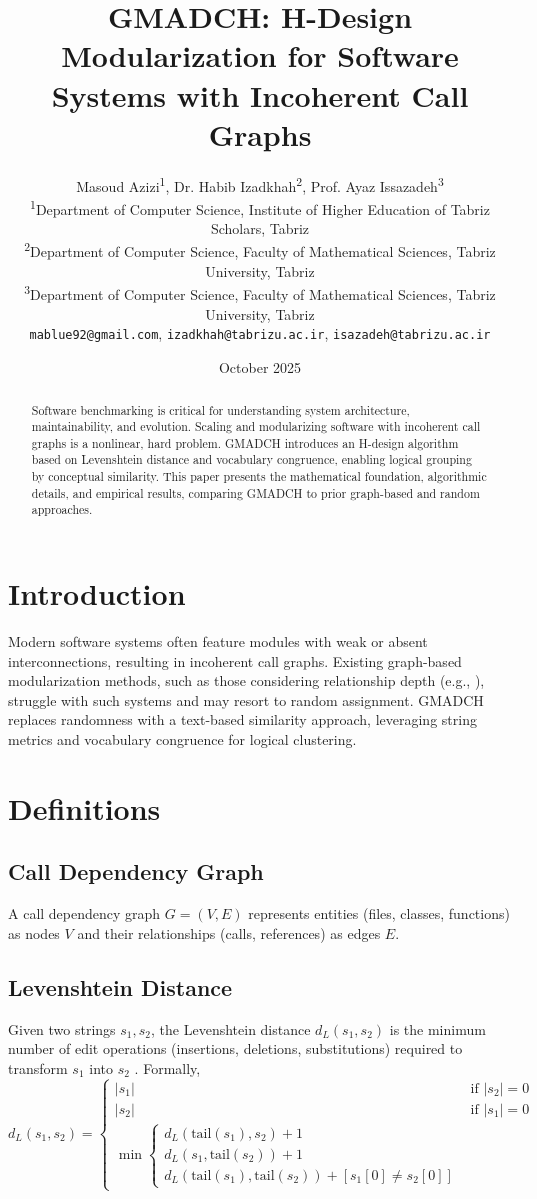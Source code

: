 \documentclass[a4paper,12pt]{article}
\title{GMADCH: H-Design Modularization for Software Systems with Incoherent Call Graphs}
\author{
  Masoud Azizi\textsuperscript{1},
  Dr. Habib Izadkhah\textsuperscript{2},
  Prof. Ayaz Issazadeh\textsuperscript{3}\\
  \small{
  \textsuperscript{1}Department of Computer Science, Institute of Higher Education of Tabriz Scholars, Tabriz\\
  \textsuperscript{2}Department of Computer Science, Faculty of Mathematical Sciences, Tabriz University, Tabriz\\
  \textsuperscript{3}Department of Computer Science, Faculty of Mathematical Sciences, Tabriz University, Tabriz\\
  \texttt{mablue92@gmail.com}, \texttt{izadkhah@tabrizu.ac.ir}, \texttt{isazadeh@tabrizu.ac.ir}
  }
}
\date{October 2025}
\begin{document}
\maketitle

\begin{abstract}
Software benchmarking is critical for understanding system architecture, maintainability, and evolution. Scaling and modularizing software with incoherent call graphs is a nonlinear, hard problem. GMADCH introduces an H-design algorithm based on Levenshtein distance and vocabulary congruence, enabling logical grouping by conceptual similarity. This paper presents the mathematical foundation, algorithmic details, and empirical results, comparing GMADCH to prior graph-based and random approaches.
\end{abstract}

\section{Introduction}
Modern software systems often feature modules with weak or absent interconnections, resulting in incoherent call graphs. Existing graph-based modularization methods, such as those considering relationship depth (e.g., \cite{Izadkhah2016,Pourasghar2020}), struggle with such systems and may resort to random assignment. GMADCH replaces randomness with a text-based similarity approach, leveraging string metrics and vocabulary congruence for logical clustering.

\section{Definitions}
\subsection{Call Dependency Graph}
A call dependency graph $G = (V, E)$ represents entities (files, classes, functions) as nodes $V$ and their relationships (calls, references) as edges $E$.

\subsection{Levenshtein Distance}
Given two strings $s_1, s_2$, the Levenshtein distance $d_L(s_1, s_2)$ is the minimum number of edit operations (insertions, deletions, substitutions) required to transform $s_1$ into $s_2$ \cite{Levenshtein1966}. Formally,
\[
d_L(s_1, s_2) = 
\begin{cases}
|s_1| & \text{if } |s_2| = 0 \\
|s_2| & \text{if } |s_1| = 0 \\
\min \begin{cases}
d_L(\text{tail}(s_1), s_2) + 1 \\
d_L(s_1, \text{tail}(s_2)) + 1 \\
d_L(\text{tail}(s_1), \text{tail}(s_2)) + [s_1[0] \neq s_2[0]]
\end{cases}
\end{cases}
\]
\end{document}
